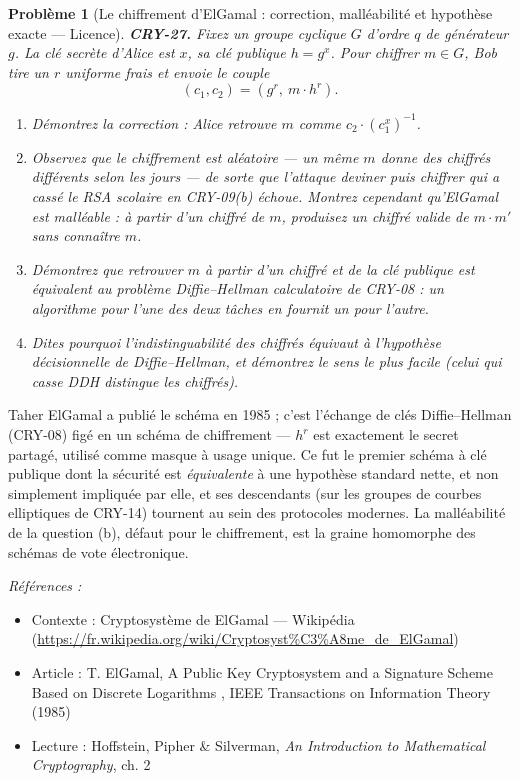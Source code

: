 \documentclass[11pt]{article}
\newtheorem{problem}{Problème}
\newenvironment{refs}{\par\small\noindent\emph{Références :}\begin{itemize}\setlength\itemsep{0pt}}{\end{itemize}\normalsize}
\begin{document}
\bigskip

\begin{problem}[{Le chiffrement d'ElGamal : correction, malléabilité et hypothèse exacte --- Licence}]
\textbf{CRY-27.} Fixez un groupe cyclique $G$ d'ordre $q$ de générateur $g$.
La clé secrète d'Alice est $x$, sa clé publique $h = g^x$. Pour chiffrer
$m \in G$, Bob tire un $r$ uniforme frais et envoie le couple
\[ (c_1, c_2) = (g^r,\ m \cdot h^r). \]
\begin{enumerate}
\item[(a)] Démontrez la correction : Alice retrouve $m$ comme $c_2 \cdot (c_1^x)^{-1}$.
\item[(b)] Observez que le chiffrement est aléatoire --- un même $m$ donne des chiffrés différents
selon les jours --- de sorte que l'attaque \og{} deviner puis chiffrer \fg{} qui a cassé le RSA
scolaire en CRY-09(b) échoue. Montrez cependant qu'ElGamal est malléable : à partir d'un
chiffré de $m$, produisez un chiffré valide de $m \cdot m'$ sans connaître $m$.
\item[(c)] Démontrez que retrouver $m$ à partir d'un chiffré et de la clé publique est
\textit{équivalent} au problème Diffie--Hellman calculatoire de CRY-08 : un algorithme pour
l'une des deux tâches en fournit un pour l'autre.
\item[(d)] Dites pourquoi l'indistinguabilité des chiffrés équivaut à l'hypothèse décisionnelle de
Diffie--Hellman, et démontrez le sens le plus facile (celui qui casse DDH distingue les
chiffrés).
\end{enumerate}

\end{problem}

\noindent Taher ElGamal a publié le schéma en 1985 ; c'est l'échange de clés
Diffie--Hellman (CRY-08) figé en un schéma de chiffrement --- $h^r$ est exactement le secret
partagé, utilisé comme masque à usage unique. Ce fut le premier schéma à clé publique dont la
sécurité est \textit{équivalente} à une hypothèse standard nette, et non simplement impliquée
par elle, et ses descendants (sur les groupes de courbes elliptiques de CRY-14) tournent au
sein des protocoles modernes. La malléabilité de la question (b), défaut pour le chiffrement,
est la graine homomorphe des schémas de vote électronique.

\begin{refs}
\item Contexte : Cryptosystème de ElGamal --- Wikipédia (\url{https://fr.wikipedia.org/wiki/Cryptosyst%C3%A8me_de_ElGamal})
\item Article : T. ElGamal, \og{} A Public Key Cryptosystem and a Signature Scheme Based on Discrete Logarithms \fg{}, IEEE Transactions on Information Theory (1985)
\item Lecture : Hoffstein, Pipher \& Silverman, \textit{An Introduction to Mathematical Cryptography}, ch. 2
\end{refs}
\end{document}
